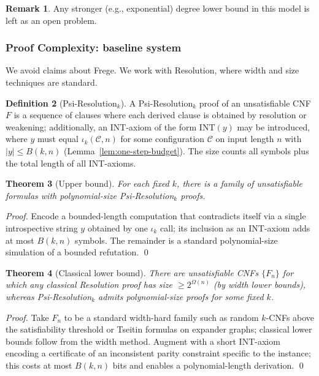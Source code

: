 \documentclass[11pt]{article}
\newtheorem{theorem}{Theorem}[section]
\theoremstyle{definition}
\newtheorem{definition}[theorem]{Definition}
\newtheorem{remark}[theorem]{Remark}
\begin{document}
\begin{remark}
Any stronger (e.g., exponential) degree lower bound in this model is left as an open problem.
\end{remark}

\subsubsection{Proof Complexity: baseline system}
\label{sec:proof-complexity}

We avoid claims about Frege. We work with Resolution, where width and size techniques are standard.

\begin{definition}[Psi-Resolution$_k$]
A Psi-Resolution$_k$ proof of an unsatisfiable CNF $F$ is a sequence of clauses where each derived clause is obtained by resolution or weakening; additionally, an INT-axiom of the form $\mathrm{INT}(y)$ may be introduced, where $y$ must equal $\iota_k(\mathcal{C},n)$ for some configuration $\mathcal{C}$ on input length $n$ with $|y|\le B(k,n)$ (Lemma~\ref{lem:one-step-budget}). The size counts all symbols plus the total length of all INT-axioms.
\end{definition}

\begin{theorem}[Upper bound]
For each fixed $k$, there is a family of unsatisfiable formulas with polynomial-size Psi-Resolution$_k$ proofs.
\end{theorem}
\begin{proof}
Encode a bounded-length computation that contradicts itself via a single introspective string $y$ obtained by one $\iota_k$ call; its inclusion as an INT-axiom adds at most $B(k,n)$ symbols. The remainder is a standard polynomial-size simulation of a bounded refutation. \qed
\end{proof}

\begin{theorem}[Classical lower bound]
There are unsatisfiable CNFs $\{F_n\}$ for which any classical Resolution proof has size $\ge 2^{\Omega(n)}$ (by width lower bounds), whereas Psi-Resolution$_k$ admits polynomial-size proofs for some fixed $k$.
\end{theorem}
\begin{proof}
Take $F_n$ to be a standard width-hard family such as random $k$-CNFs above the satisfiability threshold or Tseitin formulas on expander graphs; classical lower bounds follow from the width method. Augment with a short INT-axiom encoding a certificate of an inconsistent parity constraint specific to the instance; this costs at most $B(k,n)$ bits and enables a polynomial-length derivation. \qed
\end{proof}
\end{document}
